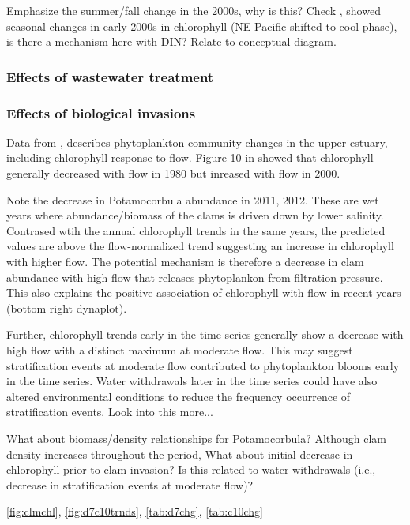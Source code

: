\documentclass[letterpaper,12pt,oneside]{article}\usepackage[]{graphicx}\usepackage[]{color}
\begin{document}
Emphasize the summer/fall change in the 2000s, why is this?  Check \citep{Cloern07}, showed seasonal changes in early 2000s in chlorophyll (NE Pacific shifted to cool phase), is there a mechanism here with DIN? Relate to conceptual diagram.

\subsubsection{Effects of wastewater treatment}


\subsubsection{Effects of biological invasions}

Data from \citep{Crauder16}, \citet{Jassby08} describes phytoplankton community changes in the upper estuary, including chlorophyll response to flow.  Figure 10 in \citet{Jassby08} showed that chlorophyll generally decreased with flow in 1980 but inreased with flow in 2000.

Note the decrease in Potamocorbula abundance in 2011, 2012.  These are wet years where abundance/biomass of the clams is driven down by lower salinity.  Contrased wtih the annual chlorophyll trends in the same years, the predicted values are above the flow-normalized trend suggesting an increase in chlorophyll with higher flow.  The potential mechanism is therefore a decrease in clam abundance with high flow that releases phytoplankon from filtration pressure.  This also explains the positive association of chlorophyll with flow in recent years (bottom right dynaplot). 

Further, chlorophyll trends early in the time series generally show a decrease with high flow with a distinct maximum at moderate flow.  This may suggest stratification events at moderate flow contributed to phytoplankton blooms early in the time series. Water withdrawals later in the time series could have also altered environmental conditions to reduce the frequency occurrence of stratification events.  Look into this more...

What about biomass/density relationships for Potamocorbula?  Although clam density increases throughout the period,  What about initial decrease in chlorophyll prior to clam invasion?  Is this related to water withdrawals (i.e., decrease in stratification events at moderate flow)?

\cref{fig:clmchl}, \cref{fig:d7c10trnds}, \cref{tab:d7chg}, \cref{tab:c10chg}
\end{document}
